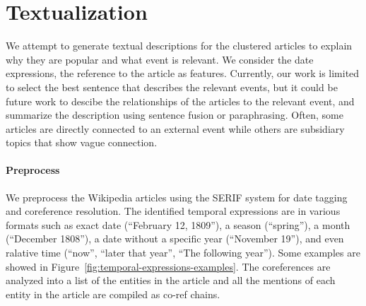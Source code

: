 \documentclass[11pt]{article}
\begin{document}
\section{Textualization}
\label{sec:textualization}

We attempt to generate textual descriptions for the clustered articles to explain why they are popular and what event is relevant.
We consider the date expressions, the reference to the article as features. Currently, our work is limited to
select the best sentence that describes the relevant events,
but it could be future work to descibe the relationships of the articles to the relevant event,
and summarize the description using sentence fusion or paraphrasing.
Often, some articles are directly connected to an external event
while others are subsidiary topics that show vague connection.


\paragraph {Preprocess}
We preprocess the Wikipedia articles using the SERIF system \cite{BoscheeSerif} for date tagging and coreference resolution.
The identified temporal expressions are in various formats such as exact date (``February 12, 1809''), a season (``spring''), a month (``December 1808''), a date without a specific year (``November 19''), and even ralative time (``now'', ``later that year'', ``The following year''). Some examples are showed in Figure~\ref{fig:temporal-expressions-examples}.
The coreferences are analyzed into a list of the entities in the article and all the mentions of each entity in the article are compiled as co-ref chains.
\end{document}
